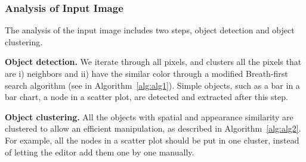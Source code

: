 \subsubsection{Analysis of Input Image}
The analysis of the input image includes two steps, object detection and object clustering.

\noindent
\textbf{Object detection.} We iterate through all pixels, and clusters all the pixels that are i) neighbors and ii) have the similar color through a modified Breath-first search algorithm (see in Algorithm~\ref{alg:alg1}). Simple objects, such as a bar in a bar chart, a node in a scatter plot, are detected and extracted after this step.

\noindent
\textbf{Object clustering.} All the objects with spatial and appearance similarity are clustered to allow an efficient manipulation, as described in Algorithm~\ref{alg:alg2}. For example, all the nodes in a scatter plot should be put in one cluster, instead of letting the editor add them one by one manually.     

